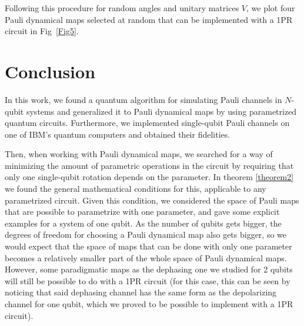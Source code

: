 \documentclass[10pt,letterpaper]{article} %
\newcommand{\fref}[1]{Fig~\ref{#1}}
\begin{document}
Following this procedure for random
angles and unitary matrices $V$, 
we plot four Pauli dynamical maps  selected at random
that can be implemented with a 1PR circuit in \fref{Fig5}. 

\section{Conclusion} %

% 
% 
In this work, we found a quantum algorithm for 
simulating Pauli channels in $N$-qubit systems and
generalized it to Pauli dynamical maps
by using parametrized quantum circuits.
Furthermore, we implemented single-qubit Pauli channels
on one of IBM's quantum computers
and obtained their fidelities. 

Then, when working with Pauli dynamical maps,
we searched for a way of minimizing the amount of 
parametric operations in the circuit 
by requiring that only one single-qubit rotation depends on the parameter. 
In theorem \ref{theorem2} we found the general mathematical conditions for 
this, applicable to any parametrized circuit.
Given this condition, we considered the space of Pauli maps that are
possible to parametrize with one parameter, and gave some explicit examples for
a system of one qubit.  As the number of qubits gets bigger, the degrees of
freedom for choosing a Pauli dynamical map also gets bigger, so we would expect
that the space of maps that can be done with only one parameter
becomes a relatively smaller part of the whole space of Pauli dynamical maps.
However, some paradigmatic maps as the dephasing one we studied for 2 qubits will still be possible to do with a 1PR circuit (for this
case, this can be seen by noticing that said dephasing channel
has the same form as the depolarizing channel for one qubit,
which we proved to be possible to implement with a 1PR circuit).
\end{document}
